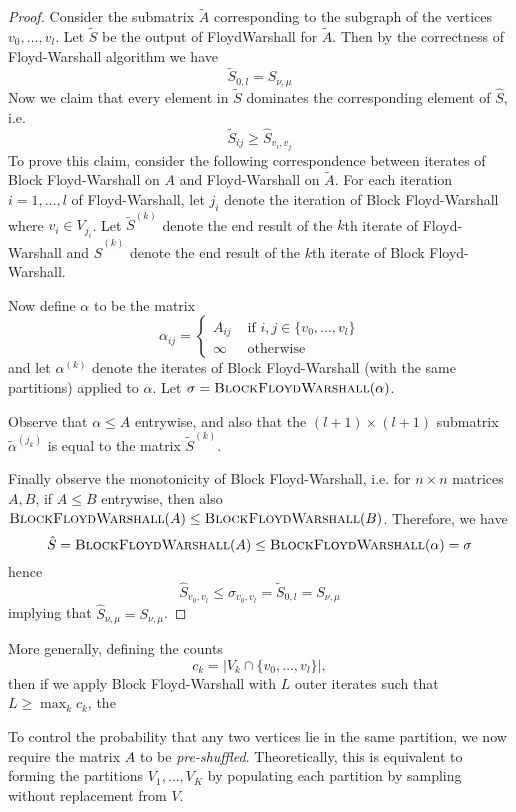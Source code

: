 \documentclass{article} %
\begin{document}
\begin{proof}
Consider the submatrix $\tilde{A}$ corresponding to the subgraph of
the vertices $v_0,\hdots, v_l$.  Let $\tilde{S}$ be the output of {\sc
  FloydWarshall} for $\tilde{A}$.  Then by the correctness of Floyd-Warshall algorithm we have
\[
\tilde{S}_{0, l} = S_{\nu, \mu}
\]
Now we claim that every element in $\tilde{S}$ dominates the corresponding
element of $\hat{S}$, i.e.
\[
\tilde{S}_{ij} \geq \hat{S}_{v_i, v_j}
\]
To prove this claim, consider the following correspondence between
iterates of Block Floyd-Warshall on $A$ and Floyd-Warshall on
$\tilde{A}$.  For each iteration $i = 1,\hdots, l$ of Floyd-Warshall,
let $j_i$ denote the iteration of Block Floyd-Warshall where $v_i \in
V_{j_i}$.  Let $\tilde{S}^{(k)}$ denote the end result of the $k$th
iterate of Floyd-Warshall and $\hat{S}^{(k)}$ denote the end result of
the $k$th iterate of Block Floyd-Warshall.

Now define $\alpha$ to be the matrix
\[
\alpha_{ij} = \begin{cases}
A_{ij} & \text{ if } i, j \in \{v_0,\hdots, v_l\}\\
\infty & \text{ otherwise}
\end{cases}
\]
and let $\alpha^{(k)}$ denote the iterates of Block Floyd-Warshall (with the same partitions) applied to $\alpha$.
Let $\sigma = \text{\sc BlockFloydWarshall}(\alpha)$.

Observe that $\alpha \leq A$ entrywise, and also that the $(l+1)
\times (l+1)$ submatrix $\tilde{\alpha}^{(j_k)}$ is equal to the
matrix $\tilde{S}^{(k)}$.

Finally observe the monotonicity of Block Floyd-Warshall, i.e. for $n
\times n$ matrices $A, B$, if $A \leq B$ entrywise, then also
$\text{\sc BlockFloydWarshall}(A) \leq \text{\sc
  BlockFloydWarshall}(B)$.  Therefore, we have
\[
\hat{S} = \text{\sc BlockFloydWarshall}(A) \leq \text{\sc BlockFloydWarshall}(\alpha) = \sigma
\]
hence
\[
\hat{S}_{v_0, v_l} \leq \sigma_{v_0, v_l} = \tilde{S}_{0, l} = S_{\nu, \mu}
\]
implying that $\hat{S}_{\nu, \mu} = S_{\nu,\mu}$.
\end{proof}


More generally, defining the counts
\[
c_k = |V_k \cap \{v_0,\hdots, v_l\}|,
\] 
then if we apply Block Floyd-Warshall with $L$ outer iterates such that $L \geq \max_k c_k$,
the 

To control the probability that any two vertices lie in the same
partition, we now require the matrix $A$ to be \emph{pre-shuffled}.
Theoretically, this is equivalent to forming the partitions
$V_1,\hdots, V_K$ by populating each partition by sampling without
replacement from $V$.
\end{document}
